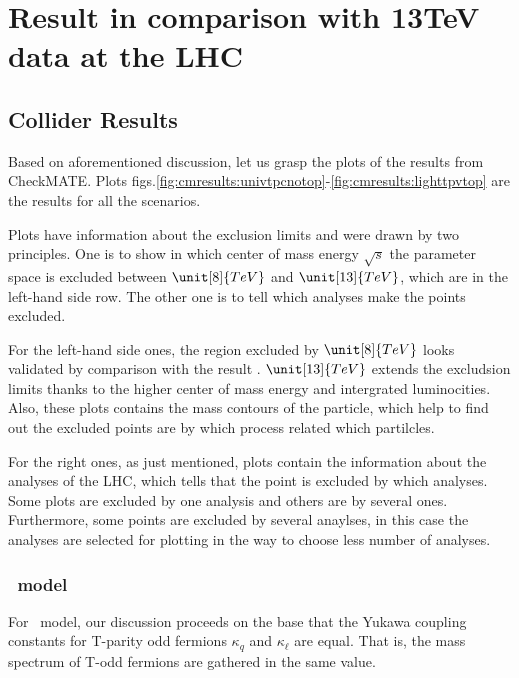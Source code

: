 \chapter{Result in comparison with 13TeV data at the LHC}
\label{chap:LHCresultLHM}
% 

\section{Collider Results}
% 
Based on aforementioned discussion, let us grasp the plots of the results from CheckMATE. 
Plots figs.\ref{fig:cmresults:univtpcnotop}-\ref{fig:cmresults:lighttpvtop} are the results for all the scenarios.

Plots have information about the exclusion limits and were drawn by two principles. 
One is to show in which center of mass energy $\sqrt{s}$ the parameter space is excluded between $\unit[8]{TeV}$ and $\unit[13]{TeV}$, which are in the left-hand side row.
The other one is to tell which analyses make the points excluded. 

For the left-hand side ones, the region excluded by $\unit[8]{TeV}$ looks validated by comparison with the result . 
$\unit[13]{TeV}$ extends the excludsion limits thanks to the higher center of mass energy and intergrated luminocities.
Also, these plots contains the mass contours of the particle, which help to find out the excluded points are by which process related which partilcles. 

For the right ones, as just mentioned, plots contain the information about the analyses of the LHC,
which tells that the point is excluded by which analyses. 
Some plots are excluded by one analysis and others are by several ones. 
Furthermore, some points are excluded by several anaylses, in this case the analyses are selected for plotting in the way to choose less number of analyses.



\subsection{\fu~model}
For \fu~model, our discussion proceeds on the base that the Yukawa coupling constants for T-parity odd fermions $\kappa_q$ and $\kappa_\ell$ are equal.
That is, the mass spectrum of T-odd fermions are gathered in the same value.


